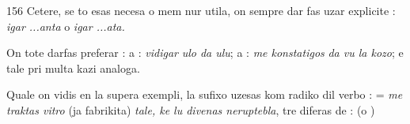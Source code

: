 \begin{VUpage}[160]{156}
Cetere, se to esas necesa o mem nur utila, on sempre dar\cc
fas uzar explicite : \textit{igar ...anta} o \textit{igar ...ata.}

On tote darfas preferar :  a : \textit{vidigar}\nl
\textit{ulo da ulu};  a : \textit{me konstatigos}\nl
\textit{da vu la kozo}; e tale pri multa kazi analoga.

Quale on vidis en la supera exempli, la sufixo  uzesas\nl
kom radiko dil verbo  :  = \textit{me}\nl
\textit{traktas vitro} (ja fabrikita) \textit{tale, ke lu divenas neruptebla}, tre\nl
diferas de :  (o )\parplein
\end{VUpage}

